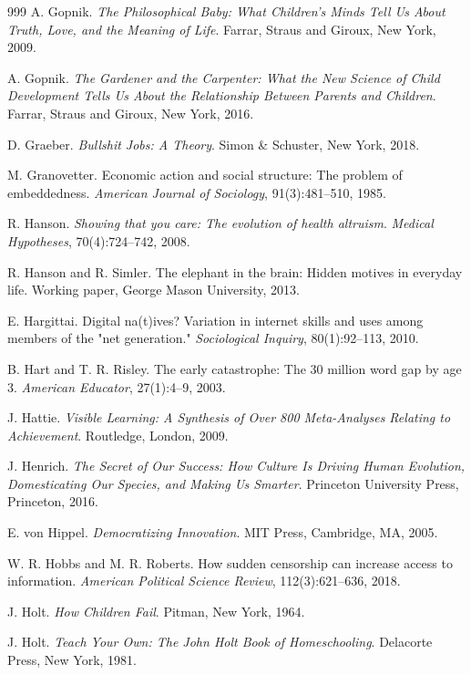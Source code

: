 \documentclass[11pt]{article}
\begin{document}
\begin{thebibliography}{999}
A. Gopnik.
\textit{The Philosophical Baby: What Children's Minds Tell Us About Truth, Love, and the Meaning of Life}.
Farrar, Straus and Giroux, New York, 2009.

A. Gopnik.
\textit{The Gardener and the Carpenter: What the New Science of Child Development Tells Us About the Relationship Between Parents and Children}.
Farrar, Straus and Giroux, New York, 2016.

D. Graeber.
\textit{Bullshit Jobs: A Theory}.
Simon \& Schuster, New York, 2018.

M. Granovetter.
Economic action and social structure: The problem of embeddedness.
\textit{American Journal of Sociology}, 91(3):481--510, 1985.

R. Hanson.
\textit{Showing that you care: The evolution of health altruism}.
\textit{Medical Hypotheses}, 70(4):724--742, 2008.

R. Hanson and R. Simler.
The elephant in the brain: Hidden motives in everyday life.
Working paper, George Mason University, 2013.

E. Hargittai.
Digital na(t)ives? Variation in internet skills and uses among members of the "net generation."
\textit{Sociological Inquiry}, 80(1):92--113, 2010.

B. Hart and T. R. Risley.
The early catastrophe: The 30 million word gap by age 3.
\textit{American Educator}, 27(1):4--9, 2003.

J. Hattie.
\textit{Visible Learning: A Synthesis of Over 800 Meta-Analyses Relating to Achievement}.
Routledge, London, 2009.

J. Henrich.
\textit{The Secret of Our Success: How Culture Is Driving Human Evolution, Domesticating Our Species, and Making Us Smarter}.
Princeton University Press, Princeton, 2016.

E. von Hippel.
\textit{Democratizing Innovation}.
MIT Press, Cambridge, MA, 2005.

W. R. Hobbs and M. R. Roberts.
How sudden censorship can increase access to information.
\textit{American Political Science Review}, 112(3):621--636, 2018.

J. Holt.
\textit{How Children Fail}.
Pitman, New York, 1964.

J. Holt.
\textit{Teach Your Own: The John Holt Book of Homeschooling}.
Delacorte Press, New York, 1981.


\end{thebibliography}
\end{document}
